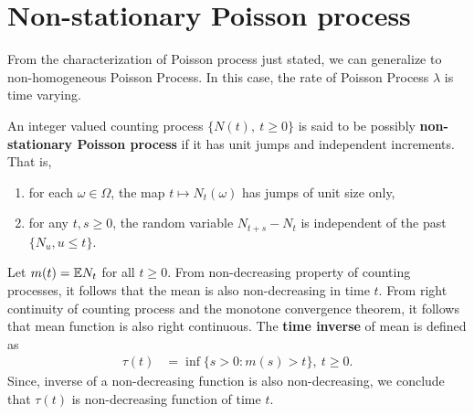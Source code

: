 \documentclass[a4paper,english,10pt]{article}
\begin{document}
\section{Non-stationary Poisson process}
From the characterization of Poisson process just stated, we can generalize to non-homogeneous Poisson Process. 
In this case, the rate of Poisson Process $\lambda$ is time varying. 

An integer valued counting process $\{N(t),~t\geqslant 0\}$ is said to be possibly \textbf{non-stationary Poisson process} if it has unit jumps and independent increments. 
That is,
\begin{enumerate} 
\item for each $\omega \in \Omega$, the map $t \mapsto N_t(\omega)$ has jumps of unit size only,
\item for any $t,s \geq 0$, the random variable $N_{t+s} - N_t$ is independent of the past $\{N_u, u \leqslant t\}$. 
\end{enumerate}
	
Let $m(t) = \mathbb{E} N_t$ for all $t \geqslant 0$. 
From non-decreasing property of counting processes, it follows that the mean is also non-decreasing in time $t$. 
From right continuity of counting process and the monotone convergence theorem, it follows that mean function is also right continuous. 
The \textbf{time inverse} of mean is defined as
\begin{align*}
\tau(t) &= \inf\{ s > 0 : m(s) > t\},~ t \geqslant 0. 
\end{align*}
Since, inverse of a non-decreasing function is also non-decreasing, we conclude that $\tau(t)$ is non-decreasing function of time $t$. 
\end{document}
